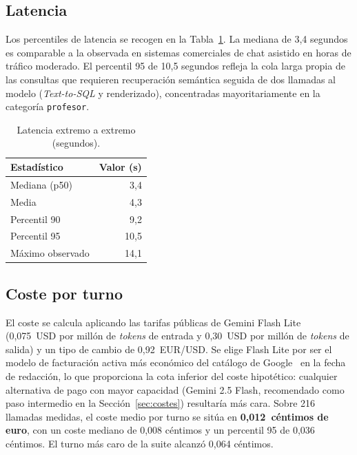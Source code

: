 \subsection{Latencia}\label{subsec:no-funcional-latencia}

Los percentiles de latencia se recogen en la Tabla~\ref{tab:latencia}. La mediana de 3,4 segundos es comparable a la observada en sistemas comerciales de chat asistido en horas de tráfico moderado. El percentil 95 de 10,5 segundos refleja la cola larga propia de las consultas que requieren recuperación semántica seguida de dos llamadas al modelo (\textit{Text-to-SQL} y renderizado), concentradas mayoritariamente en la categoría \texttt{profesor}.

\begin{table}[hbtp]
\centering
\caption{Latencia extremo a extremo (segundos).}\label{tab:latencia}
\begin{tabular}{lr}
\hline
\textbf{Estadístico} & \textbf{Valor (s)} \\
\hline
Mediana (p50) & 3{,}4 \\
Media & 4{,}3 \\
Percentil 90 & 9{,}2 \\
Percentil 95 & 10{,}5 \\
Máximo observado & 14{,}1 \\
\hline
\end{tabular}
\end{table}

\subsection{Coste por turno}\label{subsec:no-funcional-coste}

El coste se calcula aplicando las tarifas públicas de Gemini Flash Lite (0,075~USD por millón de \textit{tokens} de entrada y 0,30~USD por millón de \textit{tokens} de salida) y un tipo de cambio de 0,92~EUR/USD. Se elige Flash Lite por ser el modelo de facturación activa más económico del catálogo de Google~\cite{geminiPricing} en la fecha de redacción, lo que proporciona la cota inferior del coste hipotético: cualquier alternativa de pago con mayor capacidad (Gemini 2.5 Flash, recomendado como paso intermedio en la Sección~\ref{sec:costes}) resultaría más cara. Sobre 216 llamadas medidas, el coste medio por turno se sitúa en \textbf{0,012~céntimos de euro}, con un coste mediano de 0,008 céntimos y un percentil 95 de 0,036 céntimos. El turno más caro de la suite alcanzó 0,064 céntimos.

